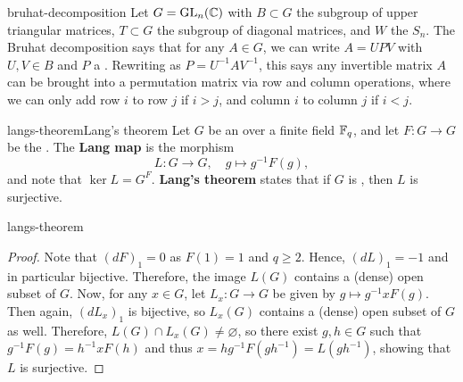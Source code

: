 \begin{example}{bruhat-decomposition}
    Let $G = \textup{GL}_n(\mathbb{C})$ with $B \subset G$ the subgroup of upper triangular matrices, $T \subset G$ the subgroup of diagonal matrices, and $W$ the  $S_n$. The Bruhat decomposition says that for any $A \in G$, we can write $A = U P V$ with $U, V \in B$ and $P$ a . Rewriting as $P = U^{-1} A V^{-1}$, this says any invertible matrix $A$ can be brought into a permutation matrix via row and column operations, where we can only add row $i$ to row $j$ if $i > j$, and column $i$ to column $j$ if $i < j$.
\end{example}

\begin{topic}{langs-theorem}{Lang's theorem}
    Let $G$ be an  over a finite field $\mathbb{F}_q$, and let $F : G \to G$ be the . The \textbf{Lang map} is the morphism
    \[ L : G \to G, \quad g \mapsto g^{-1} F(g) , \]
    and note that $\ker L = G^F$. \textbf{Lang's theorem} states that if $G$ is , then $L$ is surjective.
\end{topic}

\begin{example}{langs-theorem}
    \begin{proof}
        Note that $(dF)_1 = 0$ as $F(1) = 1$ and $q \ge 2$. Hence, $(dL)_1 = -1$ and in particular bijective. Therefore, the image $L(G)$ contains a (dense) open subset of $G$. Now, for any $x \in G$, let $L_x : G \to G$ be given by $g \mapsto g^{-1} x F(g)$. Then again, $(dL_x)_1$ is bijective, so $L_x(G)$ contains a (dense) open subset of $G$ as well. Therefore, $L(G) \cap L_x(G) \ne \varnothing$, so there exist $g, h \in G$ such that $g^{-1} F(g) = h^{-1} x F(h)$ and thus $x = hg^{-1} F(gh^{-1}) = L(gh^{-1})$, showing that $L$ is surjective.
    \end{proof}
\end{example}

